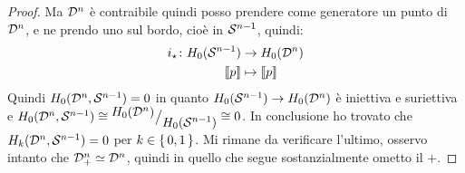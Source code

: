 \begin{proof}
  Ma $ \mathcal{D}^{n} $ è contraibile quindi posso prendere come generatore un punto di $ \mathcal{D}^{n} $, e ne prendo
  uno sul bordo, cioè in $ \mathcal{S}^{n-1} $, quindi:
  \begin{align*}
    i_\star \colon H_0(\mathcal{S}^{n-1}) & \to H_0(\mathcal{D}^{n}) \\
    \llbracket p \rrbracket & \mapsto \llbracket p \rrbracket
  \end{align*}
  Quindi $ H_0(\mathcal{D}^{n}, \mathcal{S}^{n-1}) = 0 $ in quanto $ H_0(\mathcal{S}^{n-1}) \to H_0(\mathcal{D}^{n}) $ è iniettiva
  e suriettiva e $ H_0(\mathcal{D}^{n}, \mathcal{S}^{n-1}) \cong {^{\textstyle H_0(\mathcal{D}^{n})}\big/_{\textstyle H_0(\mathcal{S}^{n-1})}} \cong 0 $.
  In conclusione ho trovato che $ H_k(\mathcal{D}^{n}, \mathcal{S}^{n-1}) = 0 $ per $ k \in \set{0,1} $.
  Mi rimane da verificare l'ultimo, osservo intanto che $ \mathcal{D}^{n}_+ \simeq \mathcal{D}^{n} $,
  quindi in quello che segue sostanzialmente ometto il $ + $.


\end{proof}
